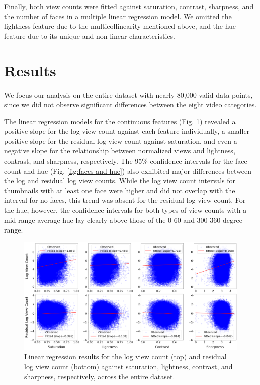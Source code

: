 \documentclass{article}
\begin{document}
Finally, both view counts were fitted against saturation, contrast, sharpness, and the number of faces in a multiple linear regression model. We omitted the lightness feature due to the multicollinearity mentioned above, and the hue feature due to its unique and non-linear characteristics.

\section{Results}
We focus our analysis on the entire dataset with nearly 80,000 valid data points, since we did not observe significant differences between the eight video categories.

The linear regression models for the continuous features (Fig. \ref{fig:lr}) revealed a positive slope for the log view count against each feature individually, a smaller positive slope for the residual log view count against saturation, and even a negative slope for the relationship between normalized views and lightness, contrast, and sharpness, respectively. The 95\% confidence intervals for the face count and hue (Fig. \ref{fig:faces-and-hue}) also exhibited major differences between the log and residual log view counts. While the log view count intervals for thumbnails with at least one face were higher and did not overlap with the interval for no faces, this trend was absent for the residual log view count. For the hue, however, the confidence intervals for both types of view counts with a mid-range average hue lay clearly above those of the 0-60 and 300-360 degree range.

\begin{figure}[h]


  \centering
  \includegraphics[width=\textwidth]{figs/lr.png}
  \caption{Linear regression results for the log view count (top) and residual log view count (bottom) against saturation, lightness, contrast, and sharpness, respectively, across the entire dataset.}
  \label{fig:lr}
\end{figure}
\end{document}
